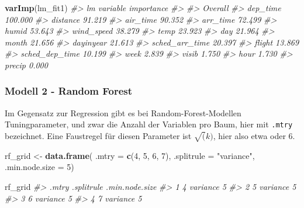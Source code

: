 \documentclass[]{article}
\newenvironment{Shaded}{\begin{snugshade}}{\end{snugshade}}
\newcommand{\CommentTok}[1]{\textcolor[rgb]{0.56,0.35,0.01}{\textit{#1}}}
\newcommand{\DataTypeTok}[1]{\textcolor[rgb]{0.13,0.29,0.53}{#1}}
\newcommand{\DecValTok}[1]{\textcolor[rgb]{0.00,0.00,0.81}{#1}}
\newcommand{\KeywordTok}[1]{\textcolor[rgb]{0.13,0.29,0.53}{\textbf{#1}}}
\newcommand{\NormalTok}[1]{#1}
\newcommand{\StringTok}[1]{\textcolor[rgb]{0.31,0.60,0.02}{#1}}
\begin{document}
\begin{Shaded}
\begin{Highlighting}[]
\KeywordTok{varImp}\NormalTok{(lm_fit1)}
\CommentTok{#> lm variable importance}
\CommentTok{#> }
\CommentTok{#>                Overall}
\CommentTok{#> dep_time       100.000}
\CommentTok{#> distance        91.219}
\CommentTok{#> air_time        90.352}
\CommentTok{#> arr_time        72.499}
\CommentTok{#> humid           53.643}
\CommentTok{#> wind_speed      38.279}
\CommentTok{#> temp            23.923}
\CommentTok{#> day             21.964}
\CommentTok{#> month           21.656}
\CommentTok{#> dayinyear       21.613}
\CommentTok{#> sched_arr_time  20.397}
\CommentTok{#> flight          13.869}
\CommentTok{#> sched_dep_time  10.199}
\CommentTok{#> week             2.839}
\CommentTok{#> visib            1.750}
\CommentTok{#> hour             1.730}
\CommentTok{#> precip           0.000}
\end{Highlighting}
\end{Shaded}

\hypertarget{modell-2---random-forest}{%
\subsubsection{Modell 2 - Random
Forest}\label{modell-2---random-forest}}

Im Gegensatz zur Regression gibt es bei Random-Forest-Modellen
Tuningparameter, und zwar die Anzahl der Variablen pro Baum, hier mit
\texttt{.mtry} bezeichnet. Eine Faustregel für diesen Parameter ist
\(\sqrt(k)\), hier also etwa oder 6.

\begin{Shaded}
\begin{Highlighting}[]
\NormalTok{rf_grid <-}\StringTok{ }\KeywordTok{data.frame}\NormalTok{(}
  \DataTypeTok{.mtry =} \KeywordTok{c}\NormalTok{(}\DecValTok{4}\NormalTok{, }\DecValTok{5}\NormalTok{, }\DecValTok{6}\NormalTok{, }\DecValTok{7}\NormalTok{),}
  \DataTypeTok{.splitrule =} \StringTok{"variance"}\NormalTok{,}
  \DataTypeTok{.min.node.size =} \DecValTok{5}\NormalTok{)}

\NormalTok{rf_grid}
\CommentTok{#>   .mtry .splitrule .min.node.size}
\CommentTok{#> 1     4   variance              5}
\CommentTok{#> 2     5   variance              5}
\CommentTok{#> 3     6   variance              5}
\CommentTok{#> 4     7   variance              5}
\end{Highlighting}
\end{Shaded}
\end{document}
